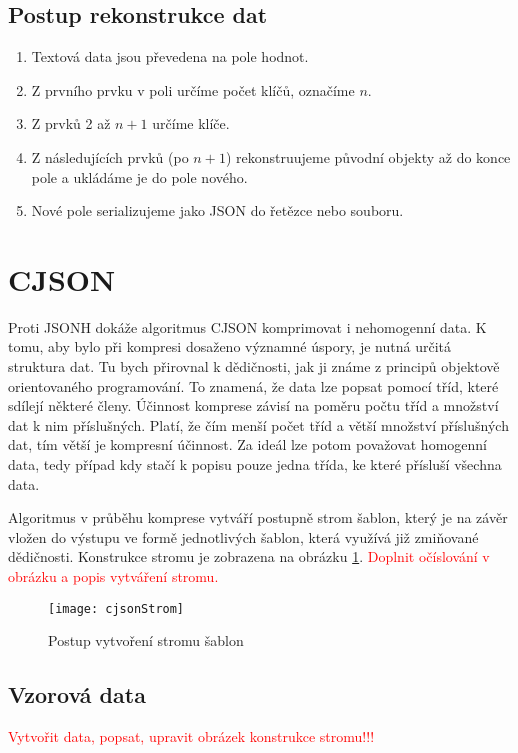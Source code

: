 \subsection{Postup rekonstrukce dat}
\begin{enumerate}
\item Textová data jsou převedena na pole hodnot.
\item Z prvního prvku v poli určíme počet klíčů, označíme $n$.
\item Z prvků 2 až $n+1$ určíme klíče.
\item Z následujících prvků (po $n+1$) rekonstruujeme původní objekty až do konce pole a ukládáme je do pole nového.
\item Nové pole serializujeme jako JSON do řetězce nebo souboru.
\end{enumerate}

\section{CJSON}
\label{cjson}
Proti JSONH dokáže algoritmus CJSON komprimovat i nehomogenní data. K tomu, aby bylo při kompresi dosaženo významné úspory, je nutná určitá struktura dat. Tu bych přirovnal k dědičnosti, jak ji známe z principů objektově orientovaného programování. To znamená, že data lze popsat pomocí tříd, které sdílejí některé členy. Účinnost komprese závisí na poměru počtu tříd a množství dat k nim příslušných. Platí, že čím menší počet tříd a větší množství příslušných dat, tím větší je kompresní účinnost. Za ideál lze potom považovat homogenní data, tedy případ kdy stačí k popisu pouze jedna třída, ke které přísluší všechna data.

Algoritmus v průběhu komprese vytváří postupně strom šablon, který je na závěr vložen do výstupu ve formě jednotlivých šablon, která využívá již zmiňované dědičnosti. Konstrukce stromu je zobrazena na obrázku \ref{cjsonKonstrukceStromu}. \textcolor{red}{Doplnit očíslování v obrázku a popis vytváření stromu.}

\begin{figure}[!htb]
\centering
\texttt{[image: cjsonStrom]}
\caption{Postup vytvoření stromu šablon}
\label{cjsonKonstrukceStromu}
\end{figure}

\subsection{Vzorová data}
\textcolor{red}{Vytvořit data, popsat, upravit obrázek konstrukce stromu!!!}

